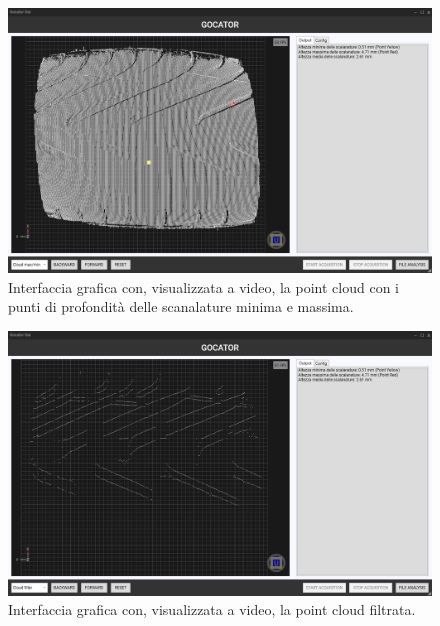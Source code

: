 \begin{figure}[H]
	\centering
	\includegraphics[width=0.9\columnwidth]{./pictures/gui_6.png}
	\caption{Interfaccia grafica con, visualizzata a video, la point cloud con i punti di profondità delle scanalature minima e massima.}\label{fig:gui_5}
\end{figure}

\begin{figure}[H]
	\centering
	\includegraphics[width=0.9\columnwidth]{./pictures/gui_7.png}
	\caption{Interfaccia grafica con, visualizzata a video, la point cloud filtrata.}\label{fig:gui_6}
\end{figure}